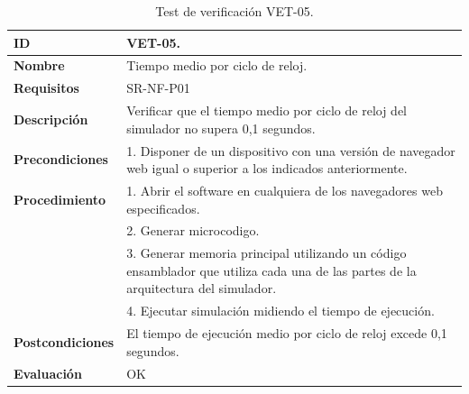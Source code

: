 \begin{center}
\begin{table}[htbp]
\centering
\caption{Test de verificación VET-05.}
\begin{tabular}{@{}p{2.5cm} p{13cm}@{}} 
\toprule
\textbf{ID} 					& VET-05. \\
\midrule
\textbf{Nombre} 				& Tiempo medio por ciclo de reloj. \\
\midrule
\textbf{Requisitos} 		& SR-NF-P01\\
\midrule
\textbf{Descripción} 		& Verificar que el tiempo medio por ciclo de reloj del simulador no supera 0,1 segundos. \\
\midrule
\textbf{Precondiciones}		& 1. Disponer de un dispositivo con una versión de navegador web igual o superior a los indicados anteriormente. \\
\midrule
\textbf{Procedimiento}			& 1. Abrir el \gls{software} en cualquiera de los navegadores web especificados. \\
							& 2. Generar \gls{microcodigo}.\\
							& 3. Generar memoria principal utilizando un código \gls{ensamblador} que utiliza cada una de las partes de la arquitectura del simulador.\\
							& 4. Ejecutar simulación midiendo el tiempo de ejecución.\\
\midrule
\textbf{Postcondiciones} 		&  El tiempo de ejecución medio por ciclo de reloj excede 0,1 segundos.\\
\midrule
\textbf{Evaluación} 			& OK \\
\bottomrule
\end{tabular}
\label{tab:vet05}
\end{table}
\end{center}

